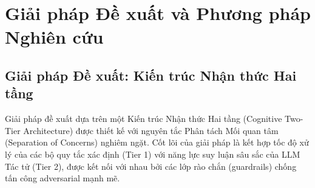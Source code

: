 \documentclass[12pt,a4paper]{article}
\begin{document}
\newpage
\section{Giải pháp Đề xuất và Phương pháp Nghiên cứu}

\subsection{Giải pháp Đề xuất: Kiến trúc Nhận thức Hai tầng}
Giải pháp đề xuất dựa trên một Kiến trúc Nhận thức Hai tầng (Cognitive Two-Tier Architecture) được thiết kế với nguyên tắc Phân tách Mối quan tâm (Separation of Concerns) nghiêm ngặt. Cốt lõi của giải pháp là kết hợp tốc độ xử lý của các bộ quy tắc xác định (Tier 1) với năng lực suy luận sâu sắc của LLM Tác tử (Tier 2), được kết nối với nhau bởi các lớp rào chắn (guardrails) chống tấn công adversarial mạnh mẽ.
\end{document}
